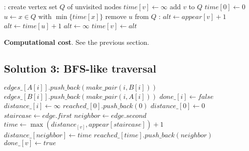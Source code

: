 \documentclass{article}
\begin{document}
\begin{algorithmic}[1]
  :
  \State create vertex set $Q$ of unvisited nodes
        
      \State $time[v] \gets \infty$  
      \State add $v$ to $Q$          
  \EndFor
  \State $time[0] \gets 0$ 
      \State $u \gets x \in Q$ with $\min \{time[x]\}$
      \State remove $u$ from $Q$
      :
              \State $alt \gets appear[v] + 1$ 
              \State $alt \gets time[u] + 1$       
          \Else
              \State $alt \gets \infty$            
          \EndIf
              \State $time[v] \gets alt$           
          \EndIf
      \EndFor
  \EndWhile
  \State {}
  \EndFunction
\end{algorithmic}

\begin{framed}
  \noindent
  \textbf{Computational cost}. See the previous section.
\end{framed}

\subsection{Solution 3: BFS-like traversal}

\begin{algorithmic}[1]
          \State $edges\_[A[i]].push\_back(make\_pair(i, B[i]))$
          \State $edges\_[B[i]].push\_back(make\_pair(i, A[i]))$
      \EndFor
          \State $done\_[i] \gets false$
          \State $distance\_[i] \gets \infty$
      \EndFor
      \State $reached\_[0].push\_back(0)$
    \State $distance\_[0] \gets 0$
            \State $staircase \gets edge.first$
            \State $neighbor \gets edge.second$
            \State $time \gets \max(distance_[v], appear[staircase])+1$
              \State $distance\_[neighbor] \gets time$
              \State $reached\_[time].push\_back(neighbor)$
            \EndIf
          \EndFor
        \State $done\_[v] \gets true$
          \EndIf
      \EndFor
    \EndFor
    \State {}
  \EndFunction
\end{algorithmic}
\end{document}
